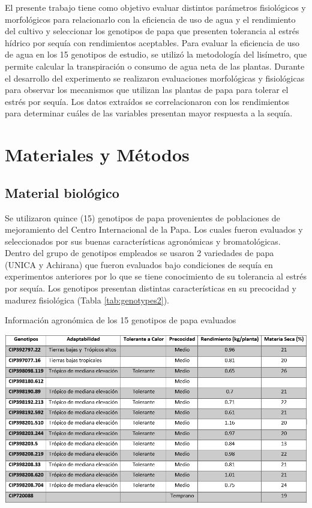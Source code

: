 \documentclass[fleqn,10pt]{Flavio}\usepackage[]{graphicx}\usepackage[]{color}
\begin{document}
El presente trabajo tiene como objetivo evaluar distintos par\'ametros fisiol\'ogicos y morfol\'ogicos para relacionarlo con la eficiencia de uso de agua y el rendimiento del cultivo y seleccionar los genotipos de papa que presenten tolerancia al estr\'es h\'idrico por sequ\'ia con rendimientos aceptables. Para evaluar la eficiencia de uso de agua en los 15 genotipos de estudio, se utiliz\'o la metodolog\'ia del lis\'imetro, que permite calcular la transpiraci\'on o consumo de agua neta de las plantas. Durante el desarrollo del experimento se realizaron evaluaciones morfol\'ogicas y fisiol\'ogicas para observar los mecanismos que utilizan las plantas de papa para tolerar el estr\'es por sequ\'ia. Los datos extra\'idos se correlacionaron con los rendimientos para determinar cu\'ales de las variables presentan mayor respuesta a la sequ\'ia.



\section{Materiales y M\'etodos}

\subsection{Material biol\'ogico}

Se utilizaron quince (15) genotipos de papa provenientes de poblaciones de mejoramiento del Centro Internacional de la Papa. Los cuales fueron evaluados y seleccionados por sus buenas caracter\'isticas agron\'omicas y bromatol\'ogicas. Dentro del grupo de genotipos empleados se usaron 2 variedades de papa (UNICA y Achirana) que fueron evaluados bajo condiciones de sequ\'ia en experimentos anteriores por lo que se tiene conocimiento de su tolerancia al estr\'es por sequ\'ia. Los genotipos presentan distintas caracter\'isticas en su precocidad y madurez fisiol\'ogica (Tabla \ref{tab:genotypes2}).

\begin{table}[ht]\centering
\caption{Informaci\'on agron\'omica de los 15 genotipos de papa evaluados}
\centering
\includegraphics[width=\linewidth]{genotypes}
\label{tab:genotypes2}
\end{table}
\end{document}
